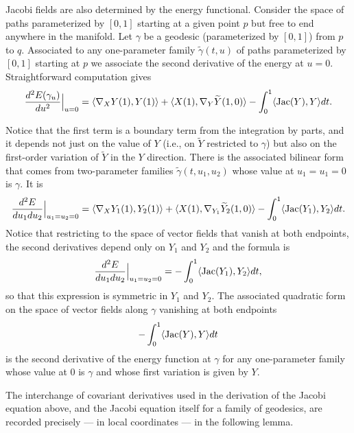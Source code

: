 Jacobi fields are also determined by the energy functional. Consider
the space of paths parameterized by $[0,1]$ starting at a given
point $p$ but free to end anywhere in the manifold. Let $\gamma$ be
a geodesic (parameterized by $[0,1]$) from $p$ to $q$. Associated to
any one-parameter family $\tilde \gamma(t,u)$ of paths parameterized
by $[0,1]$ starting at $p$ we associate the second derivative of the
energy at $u=0$. Straightforward computation gives
$$\frac{d^2E(\gamma_u)}{du^2}\Bigl|_{u=0}\Bigr.=\langle \nabla_XY(1),Y(1)\rangle+\langle
X(1),\nabla_Y\widetilde Y(1,0)\rangle-\int_0^1\langle \operatorname{Jac}(Y),Y\rangle dt.$$

Notice that the first term is a boundary term from the integration
by parts, and it depends not just on the value of $Y$ (i.e., on
$\widetilde Y$ restricted to $\gamma$) but also on the first-order
variation of $\widetilde Y$ in the $Y$ direction. There is the
associated bilinear form that comes from two-parameter families
$\tilde \gamma(t,u_1,u_2)$ whose value at $u_1=u_1=0$ is $\gamma$.
It is
$$\frac{d^2E}{du_1du_2}\Bigl|_{u_1=u_2=0}\Bigr.=\langle \nabla_XY_1(1),Y_2(1)\rangle+\langle
X(1),\nabla_{Y_1}\widetilde Y_2(1,0)\rangle-\int_0^1\langle \operatorname{Jac}(Y_1),Y_2\rangle dt.$$ Notice that restricting to the space of
vector fields that vanish at both endpoints, the second derivatives
depend only on $Y_1$ and $Y_2$ and the formula is
$$\frac{d^2E}{du_1du_2}\Bigl|_{u_1=u_2=0}\Bigr.=-\int_0^1\langle \operatorname{Jac}(Y_1),Y_2\rangle dt,$$
so that this expression is symmetric in $Y_1$ and $Y_2$. The
associated quadratic form on the space of vector fields along
$\gamma$ vanishing at both endpoints
$$-\int_0^1\langle \operatorname{Jac}(Y),Y\rangle dt$$
is the second derivative of the energy function at $\gamma$ for any
one-parameter family whose value at $0$ is $\gamma$ and whose first
variation is given by $Y$.

The interchange of covariant derivatives used in the derivation of
the Jacobi equation above, and the Jacobi equation itself for a
family of geodesics, are recorded precisely — in local coordinates —
in the following lemma.


